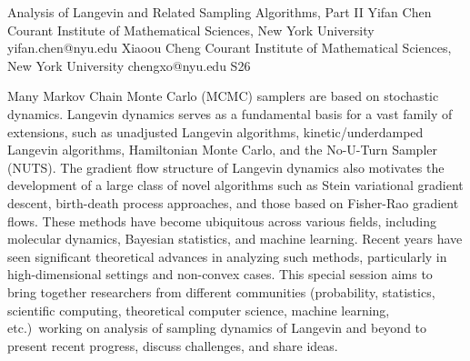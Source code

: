 

\clearpage

\begin{session}
 {Analysis of Langevin and Related Sampling Algorithms, Part II}%
 {Yifan Chen}%
 {Courant Institute of Mathematical Sciences, New York University}%
 {yifan.chen@nyu.edu}%
 {Xiaoou Cheng}%
 {Courant Institute of Mathematical Sciences, New York University}%
 {chengxo@nyu.edu}%
 {S26}%
 {}%

 {}
 Many Markov Chain Monte Carlo (MCMC) samplers are based on stochastic dynamics. Langevin dynamics serves as a fundamental basis for a vast family of extensions, such as unadjusted Langevin algorithms, kinetic/underdamped Langevin algorithms, Hamiltonian Monte Carlo, and the No-U-Turn Sampler (NUTS). The gradient flow structure of Langevin dynamics also motivates the development of a large class of novel algorithms such as Stein variational gradient descent, birth-death process approaches, and those based on Fisher-Rao gradient flows. These methods have become ubiquitous across various fields, including molecular dynamics, Bayesian statistics, and machine learning. Recent years have seen significant theoretical advances in analyzing such methods, particularly in high-dimensional settings and non-convex cases. This special session aims to bring together researchers from different communities (probability, statistics, scientific computing, theoretical computer science, machine learning, etc.)\ working on analysis of sampling dynamics of Langevin and beyond to present recent progress, discuss challenges, and share ideas.
\end{session}



\clearpage

